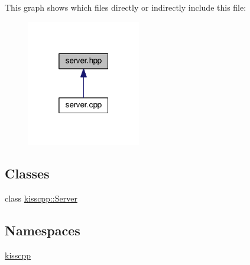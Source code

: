 This graph shows which files directly or indirectly include this file\-:\nopagebreak
\begin{figure}[H]
\begin{center}
\leavevmode
\includegraphics[width=140pt]{a00124}
\end{center}
\end{figure}
\subsection*{Classes}
\begin{DoxyCompactItemize}
\item 
class \hyperlink{a00040}{kisscpp\-::\-Server}
\end{DoxyCompactItemize}
\subsection*{Namespaces}
\begin{DoxyCompactItemize}
\item 
\hyperlink{a00089}{kisscpp}
\end{DoxyCompactItemize}
